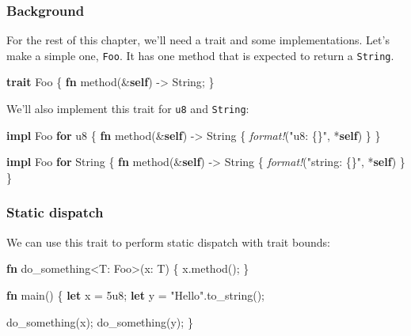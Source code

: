 \documentclass[a4paper,]{book}
\newenvironment{Shaded}{\begin{snugshade}}{\end{snugshade}}
\newcommand{\KeywordTok}[1]{\textcolor[rgb]{0.13,0.29,0.53}{\textbf{{#1}}}}
\newcommand{\DataTypeTok}[1]{\textcolor[rgb]{0.13,0.29,0.53}{{#1}}}
\newcommand{\DecValTok}[1]{\textcolor[rgb]{0.00,0.00,0.81}{{#1}}}
\newcommand{\StringTok}[1]{\textcolor[rgb]{0.31,0.60,0.02}{{#1}}}
\newcommand{\PreprocessorTok}[1]{\textcolor[rgb]{0.56,0.35,0.01}{\textit{{#1}}}}
\newcommand{\NormalTok}[1]{{#1}}
\begin{document}
\subsubsection{Background}\label{background}

For the rest of this chapter, we'll need a trait and some
implementations. Let's make a simple one, \texttt{Foo}. It has one
method that is expected to return a \texttt{String}.

\begin{Shaded}
\begin{Highlighting}[]
\KeywordTok{trait} \NormalTok{Foo \{}
    \KeywordTok{fn} \NormalTok{method(&}\KeywordTok{self}\NormalTok{) -> }\DataTypeTok{String}\NormalTok{;}
\NormalTok{\}}
\end{Highlighting}
\end{Shaded}

We'll also implement this trait for \texttt{u8} and \texttt{String}:

\begin{Shaded}
\begin{Highlighting}[]
\KeywordTok{impl} \NormalTok{Foo }\KeywordTok{for} \DataTypeTok{u8} \NormalTok{\{}
    \KeywordTok{fn} \NormalTok{method(&}\KeywordTok{self}\NormalTok{) -> }\DataTypeTok{String} \NormalTok{\{ }\PreprocessorTok{format!}\NormalTok{(}\StringTok{"u8: \{\}"}\NormalTok{, *}\KeywordTok{self}\NormalTok{) \}}
\NormalTok{\}}

\KeywordTok{impl} \NormalTok{Foo }\KeywordTok{for} \DataTypeTok{String} \NormalTok{\{}
    \KeywordTok{fn} \NormalTok{method(&}\KeywordTok{self}\NormalTok{) -> }\DataTypeTok{String} \NormalTok{\{ }\PreprocessorTok{format!}\NormalTok{(}\StringTok{"string: \{\}"}\NormalTok{, *}\KeywordTok{self}\NormalTok{) \}}
\NormalTok{\}}
\end{Highlighting}
\end{Shaded}

\subsubsection{Static dispatch}\label{static-dispatch}

We can use this trait to perform static dispatch with trait bounds:

\begin{Shaded}
\begin{Highlighting}[]
\KeywordTok{fn} \NormalTok{do_something<T: Foo>(x: T) \{}
    \NormalTok{x.method();}
\NormalTok{\}}

\KeywordTok{fn} \NormalTok{main() \{}
    \KeywordTok{let} \NormalTok{x = }\DecValTok{5u8}\NormalTok{;}
    \KeywordTok{let} \NormalTok{y = }\StringTok{"Hello"}\NormalTok{.to_string();}

    \NormalTok{do_something(x);}
    \NormalTok{do_something(y);}
\NormalTok{\}}
\end{Highlighting}
\end{Shaded}
\end{document}

